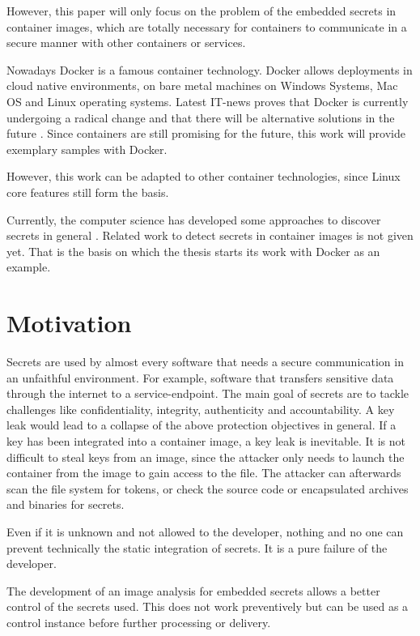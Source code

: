 However, this paper will only focus on the problem of the embedded secrets in container images, which are totally necessary for containers to communicate in a secure manner with other containers or services.

Nowadays Docker is a famous container technology. Docker allows deployments in cloud native environments, on bare metal machines on Windows Systems, Mac OS and Linux operating systems. 
Latest IT-news proves that Docker is currently undergoing a radical change and that there will be alternative solutions in the future \cite{docker_heise}. Since containers are still promising for the future, this work will provide exemplary samples with Docker.

However, this work can be adapted to other container technologies, since Linux core features still form the basis.

Currently, the computer science has developed some approaches to discover secrets in general \cite{7180102}. Related work to detect secrets in container images is not given yet.
That is the basis on which the thesis starts its work with Docker as an example.

%
%
\section{Motivation}
\label{sec:intro:motivation}
Secrets are used by almost every software that needs a secure communication in an unfaithful environment. For example, software that transfers sensitive data through the internet to a service-endpoint. The main goal of secrets are to tackle challenges like confidentiality, integrity, authenticity and accountability. A key leak would lead to a collapse of the above protection objectives in general.
If a key has been integrated into a container image, a key leak is inevitable.
It is not difficult to steal keys from an image, since the attacker only needs to launch the container from the image to gain access to the file. The attacker can afterwards scan the file system for tokens, or check the source code or encapsulated archives and binaries for secrets. 

Even if it is unknown and not allowed to the developer, nothing and no one can prevent technically the static integration of secrets. It is a pure failure of the developer.

The development of an image analysis for embedded secrets allows a better control of the secrets used. This does not work preventively but can be used as a control instance before further processing or delivery. 
%
%
